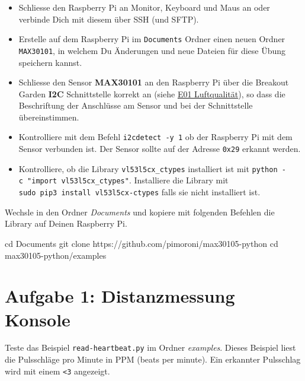 \documentclass[
  11pt,
  a4paper,
  oneside, openany  ,captions=tableheading
]{scrbook}
\newenvironment{Shaded}{\begin{snugshade}}{\end{snugshade}}
\newcommand{\BuiltInTok}[1]{\textcolor[rgb]{0.00,0.23,0.31}{#1}}
\newcommand{\FunctionTok}[1]{\textcolor[rgb]{0.28,0.35,0.67}{#1}}
\newcommand{\NormalTok}[1]{\textcolor[rgb]{0.00,0.23,0.31}{#1}}
\providecommand{\tightlist}{%
  \setlength{\itemsep}{0pt}\setlength{\parskip}{0pt}}
\theoremstyle{remark}
\renewcommand{\markright}[1]{\def\chaptertitle{#1}} %
\begin{document}
\markright{Übungsaufbau}

\begin{itemize}
\tightlist
\item
  Schliesse den Raspberry Pi an Monitor, Keyboard und Maus an oder
  verbinde Dich mit diesem über SSH (und SFTP).
\item
  Erstelle auf dem Raspberry Pi im \texttt{Documents} Ordner einen neuen
  Ordner \texttt{MAX30101}, in welchem Du Änderungen und neue Dateien
  für diese Übung speichern kannst.
\item
  Schliesse den Sensor \textbf{MAX30101} an den Raspberry Pi über die
  Breakout Garden \textbf{I2C} Schnittstelle korrekt an (siehe
  \href{E01_Luftqualitaet.qmd}{E01 Luftqualität}), so dass die
  Beschriftung der Anschlüsse am Sensor und bei der Schnittstelle
  übereinstimmen.
\item
  Kontrolliere mit dem Befehl \texttt{i2cdetect\ -y\ 1} ob der Raspberry
  Pi mit dem Sensor verbunden ist. Der Sensor sollte auf der Adresse
  \texttt{0x29} erkannt werden.
\item
  Kontrolliere, ob die Library \texttt{vl53l5cx\_ctypes} installiert ist
  mit \texttt{python\ -c\ "import\ vl53l5cx\_ctypes"}. Installiere die
  Library mit \texttt{sudo\ pip3\ install\ vl53l5cx-ctypes} falls sie
  nicht installiert ist.
\end{itemize}

Wechsle in den Ordner \emph{Documents} und kopiere mit folgenden
Befehlen die Library auf Deinen Raspberry Pi.

\begin{Shaded}
\begin{Highlighting}[]
\BuiltInTok{cd}\NormalTok{ Documents}
\FunctionTok{git}\NormalTok{ clone https://github.com/pimoroni/max30105{-}python}
\BuiltInTok{cd}\NormalTok{ max30105{-}python/examples}
\end{Highlighting}
\end{Shaded}

\section*{Aufgabe 1: Distanzmessung
Konsole}\label{aufgabe-1-distanzmessung-konsole-1}

\markright{Aufgabe 1: Distanzmessung Konsole}

Teste das Beispiel \texttt{read-heartbeat.py} im Ordner \emph{examples}.
Dieses Beispiel liest die Pulsschläge pro Minute in PPM (beats per
minute). Ein erkannter Pulsschlag wird mit einem \texttt{\textless{}3}
angezeigt.
\end{document}
